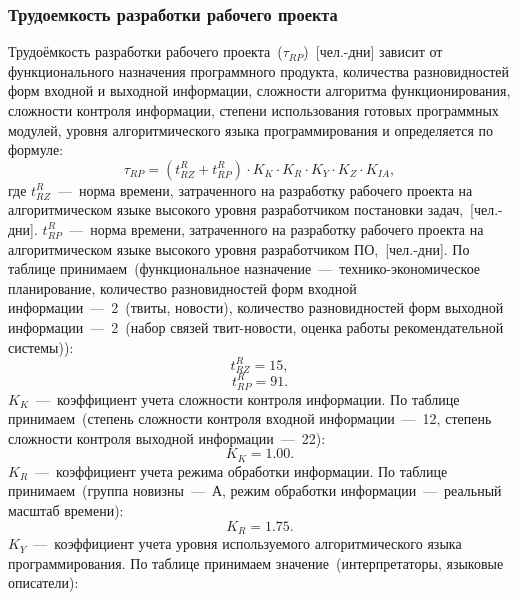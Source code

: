         \subsubsection{Трудоемкость разработки рабочего проекта}
            Трудоёмкость разработки рабочего проекта~($\tau_{RP}$)~[чел.-дни] зависит от функционального назначения программного продукта, количества разновидностей форм входной и выходной информации, сложности алгоритма функционирования, сложности контроля информации, степени использования готовых программных модулей, уровня алгоритмического языка программирования и определяется по формуле:
            \begin{equation}
                \tau_{RP} = (t^R_{RZ} + t^R_{RP}) \cdot K_K \cdot K_R \cdot K_Y \cdot K_Z \cdot K_{IA},
            \end{equation}
            где $t^R_{RZ}$~---~норма времени, затраченного на разработку рабочего проекта на алгоритмическом языке высокого уровня разработчиком постановки задач,~[чел.-дни].
            $t^R_{RP}$~---~норма времени, затраченного на разработку рабочего проекта на алгоритмическом языке высокого уровня разработчиком ПО,~[чел.-дни].
            По таблице принимаем~(функциональное назначение~---~технико-экономическое планирование,
            количество разновидностей форм входной информации~---~2~(твиты, новости),
            количество разновидностей форм выходной информации~---~2~(набор связей твит-новости, оценка работы рекомендательной системы)):
            \begin{equation*}
                t^R_{RZ} = 15,
            \end{equation*}
            \begin{equation*}
                t^R_{RP} = 91.
            \end{equation*}
            $K_K$~---~коэффициент учета сложности контроля информации.
            По таблице принимаем~(степень сложности контроля входной информации~---~12, степень сложности контроля выходной информации~---~22):
            \begin{equation*}
                K_K = 1.00.
            \end{equation*}
            $K_R$~---~коэффициент учета режима обработки информации.
            По таблице принимаем~(группа новизны~---~А, режим обработки информации~---~реальный масштаб времени):
            \begin{equation*}
                K_R = 1.75.
            \end{equation*}
            $K_Y$~---~коэффициент учета уровня используемого алгоритмического языка программирования. По таблице принимаем значение~(интерпретаторы, языковые описатели):
